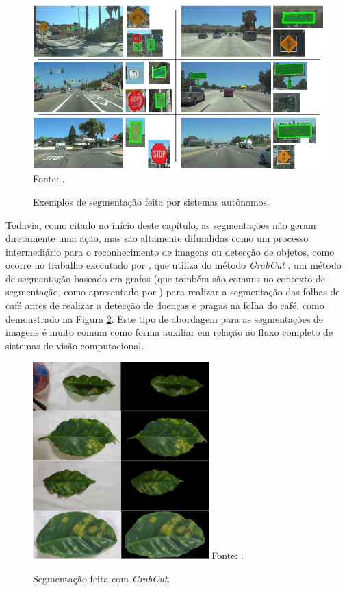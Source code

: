 \begin{figure}[H]
    \centering
    \caption{Exemplos de segmentação feita por sistemas autônomos.}
    \includegraphics[width=1\linewidth]{recursos/imagens/introduction/placas.png}
    \label{intro:fig:2}
    Fonte: \cite{Lee2018}.
\end{figure}

Todavia, como citado no início deste capítulo, as segmentações não geram diretamente uma ação, mas são altamente difundidas como um processo intermediário para o reconhecimento de imagens ou detecção de objetos, como ocorre no trabalho executado por \cite{Carneiro2021}, que utiliza do método \textit{GrabCut} \cite{rother2004grabcut}, um método de segmentação baseado em grafos (que também são comuns no contexto de segmentação, como apresentado por \cite{Yi2012}) para realizar a segmentação das folhas de café antes de realizar a detecção de doenças e pragas na folha do café, como demonstrado na Figura \ref{intro:fig:3}. Este tipo de abordagem para as segmentações de imagens é muito comum como forma auxiliar em relação ao fluxo completo de sistemas de visão computacional.

\begin{figure}[H]
    \centering
    \caption{Segmentação feita com \textit{GrabCut}.}
    \includegraphics[height=3in]{recursos/imagens/introduction/grabcut.png}
    \label{intro:fig:3}
    Fonte: \cite{Carneiro2021}.
\end{figure}

